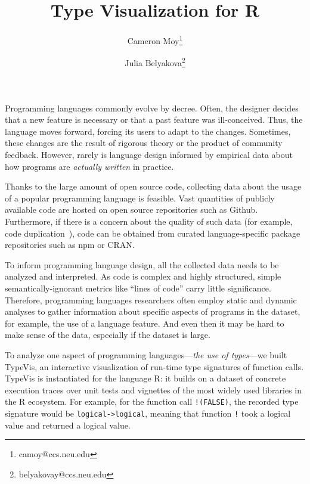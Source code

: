 \documentclass{vgtc}                          %
\title{Type Visualization for R}
\author{Cameron Moy\thanks{camoy@ccs.neu.edu}
\and Julia Belyakova\thanks{belyakovay@ccs.neu.edu}}
\affiliation{\scriptsize Northeastern University}
\newcommand{\code}[1]{\texttt{\small{#1}}}
\newcommand{\typevis}{{\sc TypeVis}\xspace}
\begin{document}

\maketitle

Programming languages commonly evolve by decree. Often, the designer
decides that a new feature is necessary or that a past feature was
ill-conceived. Thus, the language moves forward,
forcing its users to adapt to the changes.
Sometimes, these changes are the result of rigorous theory
or the product of community feedback. However, rarely is language design
informed by empirical data about how programs are \emph{actually
written} in practice.

Thanks to the large amount of open source code, collecting data about
the usage of a popular programming language is feasible. Vast
quantities of publicly available code are hosted on open source
repositories such as Github.
Furthermore, if there is a concern about the quality of such data
(for example, code duplication~\cite{lopes:2017}),
code can be obtained from curated
language-specific package repositories such as npm or CRAN.

To inform programming language design, all the collected data
needs to be analyzed and interpreted.
As code is complex and highly structured, simple semantically-ignorant
metrics like ``lines of code'' carry little significance.
Therefore, programming languages researchers often employ static
and dynamic analyses to gather information about specific aspects
of programs in the dataset, for example, the use of a language feature.
And even then it may be hard to make sense of the data,
especially if the dataset is large.

To analyze one aspect of programming languages---\emph{the use of types}---we
built \typevis, an interactive visualization of run-time type
signatures of function calls.
\typevis is instantiated for the language R:
it builds on a dataset of concrete execution traces over unit tests and vignettes
of the most widely used libraries in the R ecosystem.
For example, for the function call \code{!(FALSE)},
the recorded type signature would be \code{logical->logical},
meaning that function \code{!} took a logical value and returned a logical value.
\end{document}

